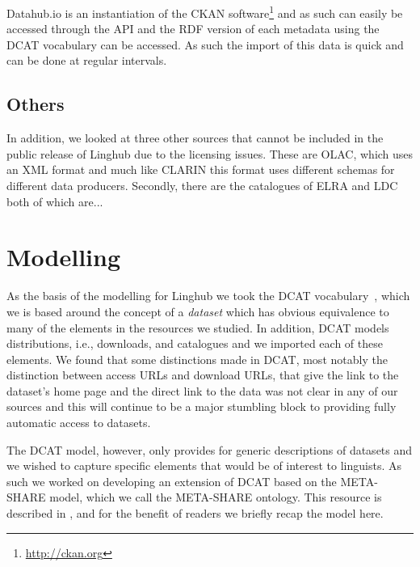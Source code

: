 \documentclass[smallextended]{svjour3}       %
\begin{document}
Datahub.io is an instantiation of the CKAN
software\footnote{\url{http://ckan.org}} and as such can
easily be accessed through the API and the RDF version of each metadata using
the DCAT vocabulary can be accessed. As such the import of this data is quick
and can be done at regular intervals.

\subsection{Others}

In addition, we looked at three other sources that cannot be included in the
public release of Linghub due to the licensing issues. These are OLAC, which
uses an XML format and much like CLARIN this format uses different schemas for
different data producers. Secondly, there are the catalogues of ELRA and LDC
both of which are... 

\section{Modelling}
\label{modelling}

As the basis of the modelling for Linghub we took the DCAT
vocabulary~\cite{maali2014data}, which we is based around the concept of a \emph{dataset}
which has obvious equivalence to many of the elements in the resources we
studied. In addition, DCAT models distributions, i.e., downloads, and catalogues
and we imported each of these elements. We found that some distinctions made in
DCAT, most notably the distinction between access URLs and download URLs, that
give the link to the dataset's home page and the direct link to the data was not
clear in any of our sources and this will continue to be a major stumbling block
to providing fully automatic access to datasets. 

The DCAT model, however, only provides for generic descriptions of datasets and
we wished to capture specific elements that would be of interest to linguists.
As such we worked on developing an extension of DCAT based on the META-SHARE
model, which we call the META-SHARE ontology. This resource is described in
\cite{mccrae2015ontology}, and for the benefit of readers we briefly recap the
model here.
\end{document}
